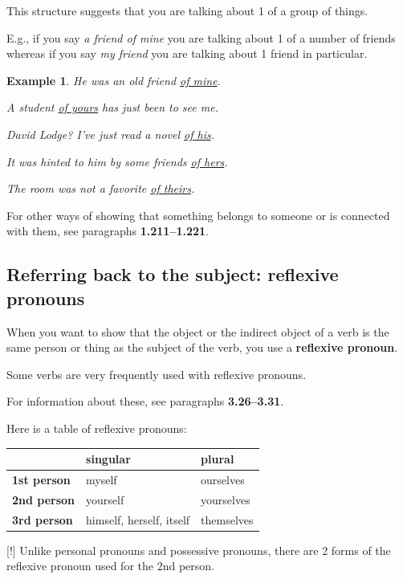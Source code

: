 \documentclass[oneside]{book}
\numberwithin{equation}{section}
\newtheorem{example}{Example}[section]
\begin{document}
This structure suggests that you are talking about 1 of a group of things.

%
E.g., if you say \textit{a friend of mine} you are talking about 1 of a number of friends whereas if you say \textit{my friend} you are talking about 1 friend in particular.
\begin{example}
    He was an old friend \underline{of mine}.
    
    A student \underline{of yours} has just been to see me.
    
    David Lodge? I've just read a novel \underline{of his}.
    
    It was hinted to him by some friends \underline{of hers}.
    
    The room was not a favorite \underline{of theirs}.
\end{example}
%
\noindent{} For other ways of showing that something belongs to someone or is connected with them, see paragraphs \textbf{1.211--1.221}.

\subsection{Referring back to the subject: reflexive pronouns}
\noindent{} When you want to show that the object or the indirect object of a verb is the same person or thing as the subject of the verb, you use a \textbf{reflexive pronoun}.

%
Some verbs are very frequently used with reflexive pronouns.

For information about these, see paragraphs \textbf{3.26--3.31}.

%
Here is a table of reflexive pronouns:
\begin{table}[H]
    \centering
    \begin{tabular}{|l|l|l|}
        \hline
        & \textbf{singular} & \textbf{plural} \\
        \hline
        \textbf{1st person} & myself & ourselves \\
        \hline
        \textbf{2nd person} & yourself & yourselves \\
        \hline
        \textbf{3rd person} & himself, herself, itself & themselves \\
        \hline
    \end{tabular}
\end{table}
%
\noindent{} [!] Unlike personal pronouns and possessive pronouns, there are 2 forms of the reflexive pronoun used for the 2nd person.
\end{document}
